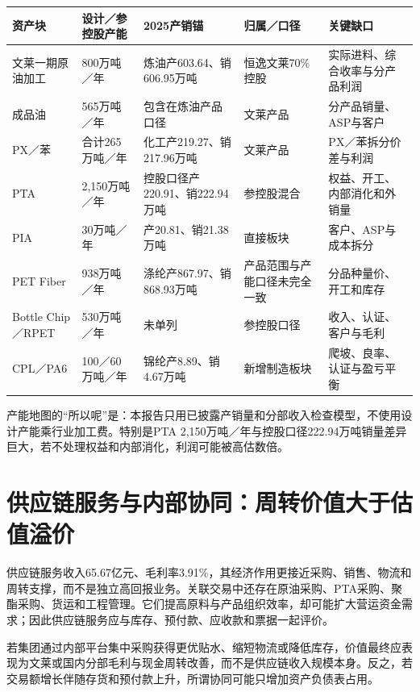 \begin{exhibitbox}[资产与产能地图]
\small
\noindent\begin{tabularx}{\textwidth}{L{2.55cm}R{2.1cm}L{2.6cm}L{2.3cm}X}
\toprule
\textbf{资产块} & \textbf{设计／参控股产能} & \textbf{2025产销锚} & \textbf{归属／口径} & \textbf{关键缺口} \\
\midrule
文莱一期原油加工 & 800万吨／年 & 炼油产603.64、销606.95万吨 & 恒逸文莱70\%控股 & 实际进料、综合收率与分产品利润 \\
成品油 & 565万吨／年 & 包含在炼油产品口径 & 文莱产品 & 分产品销量、ASP与客户 \\
PX／苯 & 合计265万吨／年 & 化工产219.27、销217.96万吨 & 文莱产品 & PX／苯拆分价差与利润 \\
PTA & 2,150万吨／年 & 控股口径产220.91、销222.94万吨 & 参控股混合 & 权益、开工、内部消化和外销量 \\
PIA & 30万吨／年 & 产20.81、销21.38万吨 & 直接板块 & 客户、ASP与成本拆分 \\
PET Fiber & 938万吨／年 & 涤纶产867.97、销868.93万吨 & 产品范围与产能口径未完全一致 & 分品种量价、开工和库存 \\
Bottle Chip／RPET & 530万吨／年 & 未单列 & 参控股口径 & 收入、认证、客户与毛利 \\
CPL／PA6 & 100／60万吨／年 & 锦纶产8.89、销4.67万吨 & 新增制造板块 & 爬坡、良率、认证与盈亏平衡 \\
\bottomrule
\end{tabularx}
\end{exhibitbox}

产能地图的“所以呢”是：本报告只用已披露产销量和分部收入检查模型，不使用设计产能乘行业加工费。特别是PTA 2,150万吨／年与控股口径222.94万吨销量差异巨大，若不处理权益和内部消化，利润可能被高估数倍。

\section{供应链服务与内部协同：周转价值大于估值溢价}

供应链服务收入65.67亿元、毛利率3.91\%，其经济作用更接近采购、销售、物流和周转支撑，而不是独立高回报业务。关联交易中还存在原油采购、PTA采购、聚酯采购、货运和工程管理。它们提高原料与产品组织效率，却可能扩大营运资金需求；因此供应链服务应与库存、预付款、应收款和票据一起评价。

若集团通过内部平台集中采购获得更优贴水、缩短物流或降低库存，价值最终应表现为文莱或国内分部毛利与现金周转改善，而不是供应链收入规模本身。反之，若交易额增长伴随存货和预付款上升，所谓协同可能只增加资产负债表占用。

